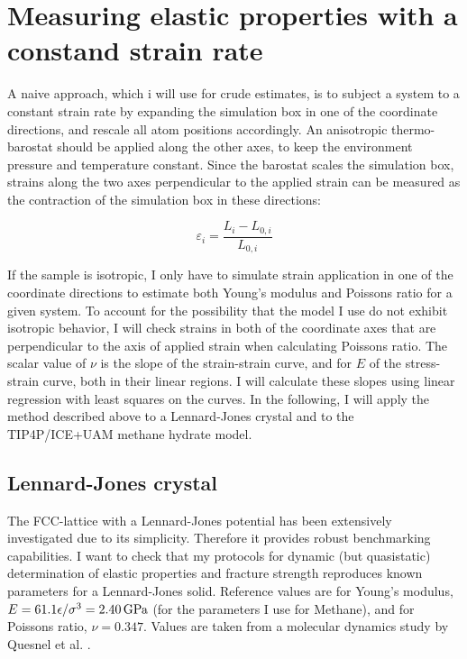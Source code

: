 \section{Measuring elastic properties with a constand strain rate}
A naive approach, which i will use for crude estimates, is to subject a system to a constant strain rate by expanding the simulation box in one of the coordinate directions, and rescale all atom positions accordingly. An anisotropic thermo-barostat should be applied along the other axes, to keep the environment pressure and temperature constant. Since the barostat scales the simulation box, strains along the two axes perpendicular to the applied strain can be measured as the contraction of the simulation box in these directions:

\begin{equation}
\varepsilon_i = \frac{L_i-L_{0, i}}{L_{0, i}}
\end{equation}

If the sample is isotropic, I only have to simulate strain application in one of the coordinate directions to estimate both Young's modulus and Poissons ratio for a given system. To account for the possibility that the model I use do not exhibit isotropic behavior, I will check strains in both of the coordinate axes that are perpendicular to the axis of applied strain when calculating Poissons ratio. The scalar value of $\nu$ is the slope of the strain-strain curve, and for $E$ of the stress-strain curve, both in their linear regions. I will calculate these slopes using linear regression with least squares on the curves.
In the following, I will apply the method described above to a Lennard-Jones crystal and to the TIP4P/ICE+UAM methane hydrate model.

\subsection{Lennard-Jones crystal}
The FCC-lattice with a Lennard-Jones potential has been extensively investigated due to its simplicity. Therefore it provides robust benchmarking capabilities. I want to check that my protocols for dynamic (but quasistatic) determination of elastic properties and fracture strength reproduces known parameters for a Lennard-Jones solid. Reference values are for Young's modulus, $E=61.1 \epsilon/\sigma^3 = \text{\SI{2.40}{\giga\pascal}}$ (for the parameters I use for Methane), and for Poissons ratio, $\nu=0.347$. Values are taken from a molecular dynamics study by Quesnel et al. \cite{Quesnel1993}.

